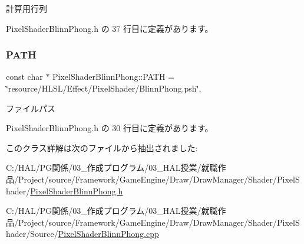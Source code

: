 計算用行列 



 Pixel\+Shader\+Blinn\+Phong.\+h の 37 行目に定義があります。

\mbox{\label{class_pixel_shader_blinn_phong_a23dbaf1801f99d9275b87f63ca58069d}} 
\subsubsection{\texorpdfstring{P\+A\+TH}{PATH}}
{\footnotesize\ttfamily const char $\ast$ Pixel\+Shader\+Blinn\+Phong\+::\+P\+A\+TH = \char`\"{}resource/H\+L\+SL/Effect/Pixel\+Shader/Blinn\+Phong.\+psh\char`\"{}\hspace{0.3cm}{\ttfamily [static]}, {\ttfamily [private]}}



ファイルパス 



 Pixel\+Shader\+Blinn\+Phong.\+h の 30 行目に定義があります。



このクラス詳解は次のファイルから抽出されました\+:\begin{DoxyCompactItemize}
\item 
C\+:/\+H\+A\+L/\+P\+G関係/03\+\_\+作成プログラム/03\+\_\+\+H\+A\+L授業/就職作品/\+Project/source/\+Framework/\+Game\+Engine/\+Draw/\+Draw\+Manager/\+Shader/\+Pixel\+Shader/\mbox{\hyperlink{_pixel_shader_blinn_phong_8h}{Pixel\+Shader\+Blinn\+Phong.\+h}}\item 
C\+:/\+H\+A\+L/\+P\+G関係/03\+\_\+作成プログラム/03\+\_\+\+H\+A\+L授業/就職作品/\+Project/source/\+Framework/\+Game\+Engine/\+Draw/\+Draw\+Manager/\+Shader/\+Pixel\+Shader/\+Source/\mbox{\hyperlink{_pixel_shader_blinn_phong_8cpp}{Pixel\+Shader\+Blinn\+Phong.\+cpp}}\end{DoxyCompactItemize}
